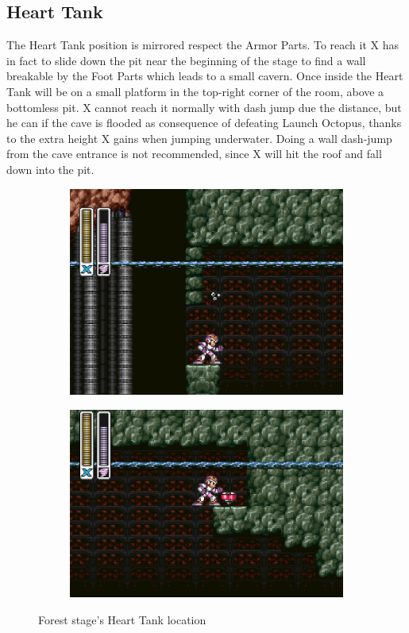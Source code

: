 \subsection{Heart Tank}
The Heart Tank position is mirrored respect the Armor Parts. To reach it X has in fact to slide down the pit near the beginning of the stage to find a wall breakable by the Foot Parts which leads to a small cavern. Once inside the Heart Tank will be on a small platform in the top-right corner of the room, above a bottomless pit. X cannot reach it normally with dash jump due the distance, but he can if  the cave is flooded as consequence of defeating Launch Octopus, thanks to the extra height X gains when jumping underwater. Doing a wall dash-jump from the cave entrance is not recommended, since X will hit the roof and fall down into the pit.
\begin{figure}[htp]
	\centering
	\begin{subfigure}{0.4\linewidth}
		\centering
		\includegraphics[width=\linewidth]{figures/X1/Sting_chameleon/Sting_heart_1.jpg}
	\end{subfigure}
	\begin{subfigure}{0.45\linewidth}
		\centering
		\includegraphics[width=\linewidth]{figures/X1/Sting_chameleon/Sting_heart_2.jpg}
	\end{subfigure}
	\caption{Forest stage's Heart Tank location}
\end{figure}

